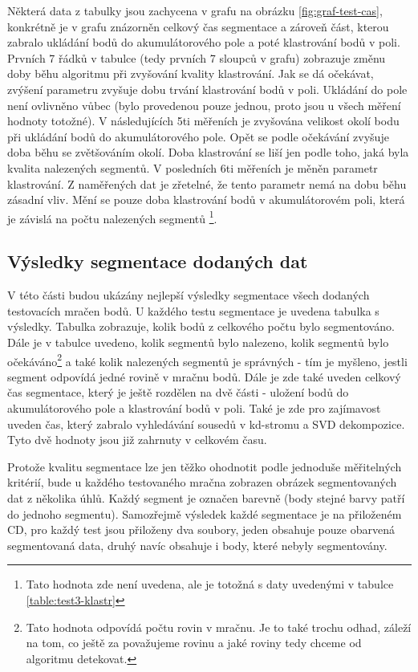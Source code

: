 \documentclass[11pt,twoside,a4paper]{book}
\begin{document}
Některá data z tabulky jsou zachycena v grafu na obrázku \ref{fig:graf-test-cas}, konkrétně je v grafu znázorněn celkový čas segmentace a zároveň část, kterou zabralo ukládání bodů do akumulátorového pole a poté klastrování bodů v poli. Prvních 7 řádků v tabulce (tedy prvních 7 sloupců v grafu) zobrazuje změnu doby běhu algoritmu při zvyšování kvality klastrování. Jak se dá očekávat, zvýšení parametru zvyšuje dobu trvání klastrování bodů v poli. Ukládání do pole není ovlivněno vůbec (bylo provedenou pouze jednou, proto jsou u všech měření hodnoty totožné). V následujících 5ti měřeních je zvyšována velikost okolí bodu při ukládání bodů do akumulátorového pole. Opět se podle očekávání zvyšuje doba běhu se zvětšováním okolí. Doba klastrování se liší jen podle toho, jaká byla kvalita nalezených segmentů. V posledních 6ti měřeních je měněn parametr klastrování. Z naměřených dat je zřetelné, že tento parametr nemá na dobu běhu zásadní vliv. Mění se pouze doba klastrování bodů v akumulátorovém poli, která je závislá na počtu nalezených segmentů \footnote{Tato hodnota zde není uvedena, ale je totožná s daty uvedenými v tabulce \ref{table:test3-klastr}}.


\subsection{Výsledky segmentace dodaných dat}
V této části budou ukázány nejlepší výsledky segmentace všech dodaných testovacích mračen bodů. U každého testu segmentace je uvedena tabulka s výsledky. Tabulka zobrazuje, kolik bodů z celkového počtu bylo segmentováno. Dále je v tabulce uvedeno, kolik segmentů bylo nalezeno, kolik segmentů bylo očekáváno\footnote{Tato hodnota odpovídá počtu rovin v mračnu. Je to také trochu odhad, záleží na tom, co ještě za považujeme rovinu a jaké roviny tedy chceme od algoritmu detekovat.} a také kolik nalezených segmentů je správných - tím je myšleno, jestli segment odpovídá jedné rovině v mračnu bodů. Dále je zde také uveden celkový čas segmentace, který je ještě rozdělen na dvě části - uložení bodů do akumulátorového pole a klastrování bodů v poli. Také je zde pro zajímavost uveden čas, který zabralo vyhledávání sousedů v kd-stromu a SVD dekompozice. Tyto dvě hodnoty jsou již zahrnuty v celkovém času.

Protože kvalitu segmentace lze jen těžko ohodnotit podle jednoduše měřitelných kritérií, bude u každého testovaného mračna zobrazen obrázek segmentovaných dat z několika úhlů. Každý segment je označen barevně (body stejné barvy patří do jednoho segmentu). Samozřejmě výsledek každé segmentace je na přiloženém CD, pro každý test jsou přiloženy dva soubory, jeden obsahuje pouze obarvená segmentovaná data, druhý navíc obsahuje i body, které nebyly segmentovány.
\end{document}
